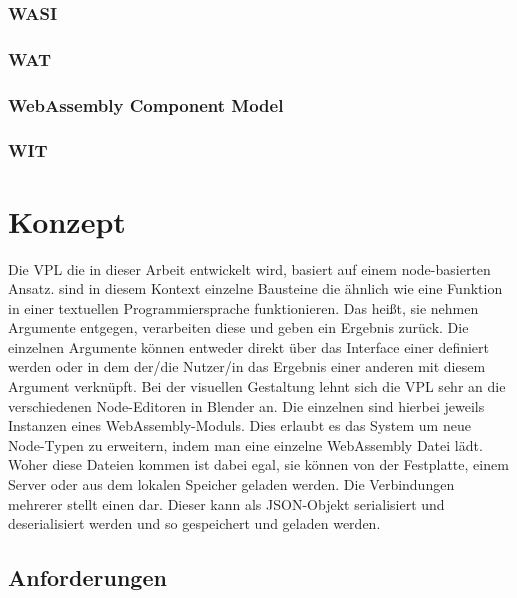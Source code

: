 \documentclass[ngerman]{article}
\begin{document}
\subsubsection{WASI}
\subsubsection{WAT}
\subsubsection{WebAssembly Component Model}
\subsubsection{WIT}

\section{Konzept}

Die VPL die in dieser Arbeit entwickelt wird, basiert auf einem node-basierten Ansatz. 
 sind in diesem Kontext einzelne Bausteine die ähnlich wie eine Funktion in einer textuellen Programmiersprache funktionieren.
Das heißt, sie nehmen Argumente entgegen, verarbeiten diese und geben ein Ergebnis zurück.
\br
Die einzelnen Argumente können entweder direkt über das Interface einer  definiert werden oder in dem der/die Nutzer/in das Ergebnis einer anderen  mit diesem Argument verknüpft.
Bei der visuellen Gestaltung lehnt sich die VPL sehr an die verschiedenen Node-Editoren in Blender an.
\br
Die einzelnen  sind hierbei jeweils Instanzen eines WebAssembly-Moduls. 
Dies erlaubt es das System um neue Node-Typen zu erweitern, indem man eine einzelne WebAssembly Datei lädt.
Woher diese Dateien kommen ist dabei egal, sie können von der Festplatte, einem Server oder aus dem lokalen Speicher geladen werden.
\br
Die Verbindungen mehrerer  stellt einen  dar. 
Dieser  kann als JSON-Objekt serialisiert und deserialisiert werden und so gespeichert und geladen werden.

\pagebreak

\subsection{Anforderungen}
\end{document}
